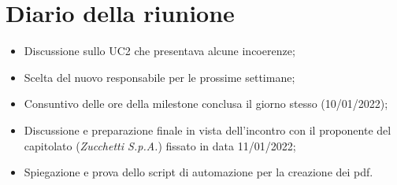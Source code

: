 \section{Diario della riunione}
\begin{itemize}
  \item Discussione sullo UC2 che presentava alcune incoerenze;
  \item Scelta del nuovo responsabile per le prossime settimane;
  \item Consuntivo delle ore della milestone conclusa il giorno stesso (10/01/2022);
  \item Discussione e preparazione finale in vista dell'incontro con il proponente del capitolato (\textit{Zucchetti S.p.A.}) fissato in data 11/01/2022;
  \item Spiegazione e prova dello script di automazione per la creazione dei pdf.
\end{itemize}
